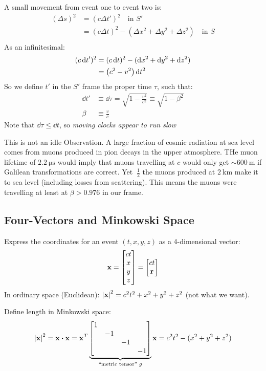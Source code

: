 A small movement from event one to event two is:
\begin{align*}
  (\Delta s)^2&=(c\Delta t')^2\quad \text{in $S'$}\\
  &=(c\Delta t)^2-(\Delta x^2+\Delta y^2+\Delta z^2)\quad \text{in $S$}\\
\end{align*}
As an infinitesimal:
\begin{align*}
  (c\dd{t}')^2&=(c\dd{t})^2-(\dd{x}^2+\dd{y}^2+\dd{z}^2)\\
  &=\qty(c^2-v^2)\dd{t}^2
\end{align*}
So we define $t'$ in the $S'$ frame the proper time $\tau$, such that:
\begin{align*}
  \dd{t}'&\equiv\dd{\tau}=\sqrt{1-\frac{v^2}{c^2}}\equiv\sqrt{1-\beta^2}\\
  \beta&\equiv\frac{v}{c}
\end{align*}
Note that $\dd{\tau}\leq\dd{t}$, so \emph{moving clocks appear to run slow}
\begin{note}
  This is not an idle Observation. A large fraction of cosmic radiation at sea level comes from muons produced in pion decays in the upper atmosphere. THe muon lifetime of $\SI{2.2}{\micro\s}$ would imply that muons travelling at $c$ would only get $\sim\SI{600}{\m}$ if Galilean transformations are correct. Yet $~\frac12$ the muons produced at $\SI{2}{\km}$ make it to sea level (including losses from scattering). This means the muons were travelling at least at $\beta>0.976$ in our frame.
\end{note}

\subsection{Four-Vectors and Minkowski Space}
Express the coordinates for an event $(t,x,y,z)$ as a 4-dimensional vector:
\begin{align*}
  \vb{x}=\bmqty{ct\\x\\y\\z}=\bmqty{ct\\\vb{r}}
\end{align*}
In ordinary space (Euclidean): $\abs{\vb{x}}^2=c^2t^2+x^2+y^2+z^2$ (not what we want).

Define length in Minkowski space:
\begin{align*}
  \abs{\vb{x}}^2=\vb{x}\vdot\vb{x}=
  \vb{x}^T
  \underbrace{\bmqty{\dmat{1,-1,-1,-1}}}_{\text{``metric tensor'' }g}\vb{x}
  =c^2t^2-(x^2+y^2+z^2)
\end{align*}

